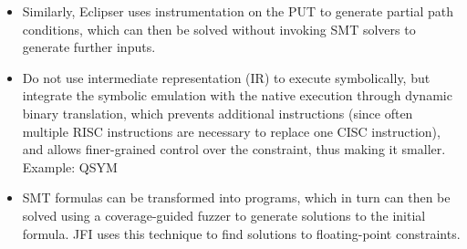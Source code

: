 \documentclass{article}
\begin{document}
\begin{multicols}{2}
\begin{itemize}
        \item Similarly, Eclipser\cite{Eclipser} uses instrumentation on the PUT to generate partial path conditions, which can then be solved without invoking SMT solvers to generate further inputs.
        \item Do not use intermediate representation (IR) to execute symbolically, but integrate the symbolic emulation with the native execution through dynamic binary translation, which prevents additional instructions (since often multiple RISC instructions are necessary to replace one CISC instruction), and allows finer-grained control over the constraint, thus making it smaller. Example: QSYM\cite{QSYM}
        \item SMT formulas can be transformed into programs, which in turn can then be solved using a coverage-guided fuzzer to generate solutions to the initial formula. JFI\cite{JFI} uses this technique to find solutions to floating-point constraints.
    \end{itemize}


\end{multicols}
\end{document}
